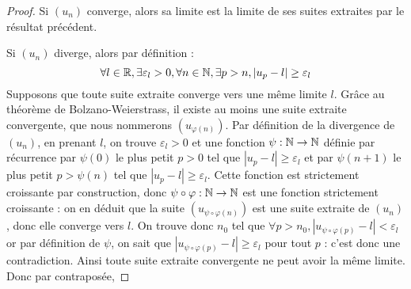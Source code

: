 \begin{proof}
    Si $(u_n)$ converge, alors sa limite est la limite de ses suites extraites par le résultat précédent.

    Si $(u_n)$ diverge, alors par définition : $$\forall l\in\mathbb{R}, \exists \varepsilon_l > 0, \forall n \in\mathbb{N},\exists p > n, |u_p - l| \geq \varepsilon_l$$ Supposons que toute suite extraite converge vers une même limite $l$. Grâce au théorème de Bolzano-Weierstrass, il existe au moins une suite extraite convergente, que nous nommerons $(u_{\varphi(n)})$. Par définition de la divergence de $(u_n)$, en prenant $l$, on trouve $\varepsilon_l > 0$ et une fonction $\psi : \mathbb{N}\to\mathbb{N}$ définie par récurrence par $\psi (0)$ le plus petit $p > 0$ tel que $|u_p - l | \geq \varepsilon_l$ et par $\psi(n+1)$ le plus petit $p > \psi(n)$ tel que $|u_p - l| \geq \varepsilon_l$. Cette fonction est strictement croissante par construction, donc $\psi\circ\varphi : \mathbb{N}\to\mathbb{N}$ est une fonction strictement croissante : on en déduit que la suite $(u_{\psi\circ\varphi(n)})$ est une suite extraite de $(u_n)$, donc elle converge vers $l$. On trouve donc $n_0$ tel que $\forall p > n_0, |u_{\psi\circ\varphi(p)} - l| < \varepsilon_l$ or par définition de $\psi$, on sait que $|u_{\psi\circ\varphi(p)} - l| \geq \varepsilon_l$ pour tout $p$ : c'est donc une contradiction. Ainsi toute suite extraite convergente ne peut avoir la même limite. Donc par contraposée, 
\end{proof}

\newpage